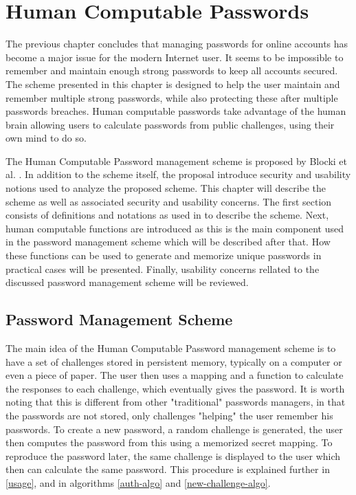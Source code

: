 \chapter{Human Computable Passwords}\label{ch:hcp}
The previous chapter concludes that managing passwords for online accounts has become a major issue for the modern Internet user. It seems to be impossible to remember and maintain enough strong passwords to keep all accounts secured. The scheme presented in this chapter is designed to help the user maintain and remember multiple strong passwords, while also protecting these after multiple passwords breaches. Human computable passwords take advantage of the human brain allowing users to calculate passwords from public challenges, using their own mind to do so. 

\par The Human Computable Password management scheme is proposed by Blocki et al. \cite{hcp-blocki}. In addition to the scheme itself, the proposal introduce security and usability notions used to analyze the proposed scheme. This chapter will describe the scheme as well as associated security and usability concerns. The first section consists of definitions and notations as used in \cite{hcp-blocki} to describe the scheme. Next, human computable functions are introduced as this is the main component used in the password management scheme which will be described after that. How these functions can be used to generate and memorize unique passwords in practical cases will be presented. Finally, usability concerns rellated to the discussed password management scheme will be reviewed.

\section{Password Management Scheme}
The main idea of the Human Computable Password management scheme is to have a set of challenges stored in persistent memory, typically on a computer or even a piece of paper. The user then uses a mapping and a function to calculate the responses to each challenge, which eventually gives the password. It is worth noting that this is different from other "traditional" passwords managers, in that the passwords are not stored, only challenges "helping" the user remember his passwords. To create a new password, a random challenge is generated, the user then computes the password from this using a memorized secret mapping. To reproduce the password later, the same challenge is displayed to the user which then can calculate the same password. This procedure is explained further in \autoref{usage}, and in algorithms \ref{auth-algo} and \autoref{new-challenge-algo}.

